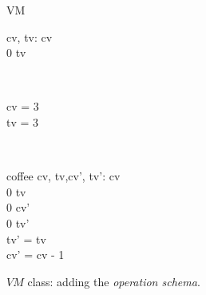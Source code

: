 \begin{figure}[H]
\centering
\begin{class}{VM}
\\
\begin{state}
cv, tv: \integer
{} \leq  cv 
\\
0 \leq  tv 
\end{state} 
\\
\begin{init}
cv = 3
\\tv = 3
\end{init} 
\\
\begin{op}{coffee}
cv, tv,cv', tv': \integer
{} \leq  cv 
\\
0 \leq  tv 
\\
0 \leq  cv' 
\\
0 \leq  tv' 
\\
tv' = tv
\\
cv' = cv - 1
\end{op}
\end{class}
\caption{$VM$ class: adding the \textit{operation schema}.}
\label{oz_vm_op_schema}
\end{figure}